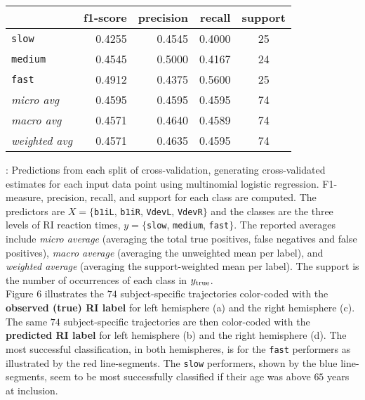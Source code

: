 \documentclass[10pt,letterpaper]{article}
\begin{document}
\begin{table}[H]
\begin{center}
\begin{tabular}{lrrrc}
\toprule
{} &  {\bf f1-score} &  {\bf precision} &  {\bf recall} &  {\bf support} \\
\midrule

{\tt slow}        &    0.4255 &     0.4545 &  0.4000 &     25 \\
{\tt medium}       &    0.4545 &     0.5000 &  0.4167 &     24 \\
{\tt fast}         &    0.4912 &     0.4375 &  0.5600 &     25 \\
{\it micro avg}    &    0.4595 &     0.4595 &  0.4595 &     74 \\
{\it macro avg}    &    0.4571 &     0.4640 &  0.4589 &     74 \\
{\it weighted avg} &    0.4571 &     0.4635 &  0.4595 &     74 \\
\bottomrule
\end{tabular}
\end{center}
\end{table}
\vspace{-5mm}


: Predictions from each split of cross-validation, generating cross-validated estimates for each input data point using multinomial logistic regression. F1-measure, precision, recall, and support for each class are computed. The predictors
are $X = \{${\tt b1iL}, {\tt b1iR}, {\tt VdevL}, {\tt VdevR}$\}$ and the classes are the three levels of RI reaction times, 
$y = \{${\tt slow}, {\tt medium}, {\tt fast}$\}$. The reported averages include {\it micro average} (averaging the total true positives, false negatives and false positives), {\it macro average} (averaging the unweighted mean per label), and {\it weighted average} (averaging the support-weighted mean per label). The support is the number of occurrences of each class in $y_{\mbox{\scriptsize true}}$.\\

\vspace{5mm}
Figure 6 illustrates the $74$ subject-specific trajectories color-coded with the {\bf observed (true) RI label} for left hemisphere (a) and the right hemisphere (c). The same  $74$ subject-specific trajectories are then color-coded with the {\bf predicted RI label} for left hemisphere (b) and the right hemisphere (d). The most successful classification, in both hemispheres, is for the {\tt fast} performers as illustrated by the red line-segments. The {\tt slow} performers, shown by the blue line-segments, seem to be most successfully classified if their age was above $65$ years at inclusion. \\
\end{document}

